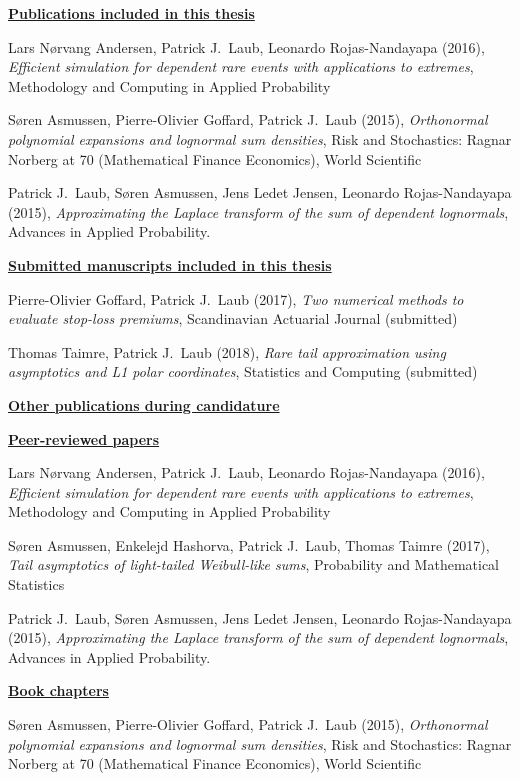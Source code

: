\newpage
{\bf \underline{Publications included in this thesis}}

Lars N{\o}rvang Andersen, Patrick J.\ Laub, Leonardo Rojas-Nandayapa (2016), \emph{Efficient simulation for dependent rare events with applications to extremes}, Methodology and Computing in Applied Probability

S{\o}ren Asmussen, Pierre-Olivier Goffard, Patrick J.\ Laub (2015), \emph{Orthonormal polynomial expansions and lognormal sum densities}, Risk and Stochastics: Ragnar Norberg at 70 (Mathematical Finance Economics), World Scientific

Patrick J.\ Laub, S{\o}ren Asmussen, Jens Ledet Jensen, Leonardo Rojas-Nandayapa (2015), \emph{Approximating the Laplace transform of the sum of dependent lognormals}, Advances in Applied Probability.

\newpage
{\bf \underline{Submitted manuscripts included in this thesis}}

Pierre-Olivier Goffard, Patrick J.\ Laub (2017), \emph{Two numerical methods to evaluate stop-loss premiums}, Scandinavian Actuarial Journal (submitted)

Thomas Taimre, Patrick J.\ Laub (2018), \emph{Rare tail approximation using asymptotics and L1 polar coordinates}, Statistics and Computing (submitted)

{\bf \underline{Other publications during candidature}}

{\small \bf \underline{Peer-reviewed papers}}

Lars N{\o}rvang Andersen, Patrick J.\ Laub, Leonardo Rojas-Nandayapa (2016), \emph{Efficient simulation for dependent rare events with applications to extremes}, Methodology and Computing in Applied Probability

S{\o}ren Asmussen, Enkelejd Hashorva, Patrick J.\ Laub, Thomas Taimre (2017), \emph{Tail asymptotics of light-tailed Weibull-like sums}, Probability and Mathematical Statistics

Patrick J.\ Laub, S{\o}ren Asmussen, Jens Ledet Jensen, Leonardo Rojas-Nandayapa (2015), \emph{Approximating the Laplace transform of the sum of dependent lognormals}, Advances in Applied Probability.

{\small \bf \underline{Book chapters}}

S{\o}ren Asmussen, Pierre-Olivier Goffard, Patrick J.\ Laub (2015), \emph{Orthonormal polynomial expansions and lognormal sum densities}, Risk and Stochastics: Ragnar Norberg at 70 (Mathematical Finance Economics), World Scientific

